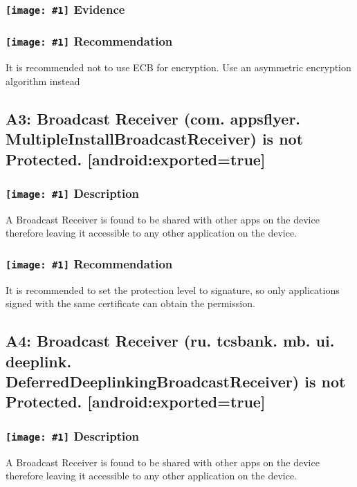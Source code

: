 \documentclass[12p]{article}
\newcommand{\icon}[1]{\texttt{[image: \#1]}}
\begin{document}
\subsubsection*{\protect\icon{/home/miki/Documents/GITHUB/AndroidPermissions/python/vulns/report_icons/basic_magnifier.png} Evidence}


\subsubsection*{\protect\icon{/home/miki/Documents/GITHUB/AndroidPermissions/python/vulns/report_icons/basic_todo.png} Recommendation}
It is recommended not to use ECB for encryption. Use an asymmetric encryption algorithm instead
\subsection{A3: Broadcast Receiver (com. appsflyer. MultipleInstallBroadcastReceiver) is not Protected. [android:exported=true]}
\subsubsection*{\protect\icon{/home/miki/Documents/GITHUB/AndroidPermissions/python/vulns/report_icons/basic_sheet.png} Description}
A Broadcast Receiver is found to be shared with other apps on the device therefore leaving it accessible to any other application on the device.
\subsubsection*{\protect\icon{/home/miki/Documents/GITHUB/AndroidPermissions/python/vulns/report_icons/basic_todo.png} Recommendation}
It is recommended to set the protection level to signature, so only applications signed with the same certificate can obtain the permission.
\subsection{A4: Broadcast Receiver (ru. tcsbank. mb. ui. deeplink. DeferredDeeplinkingBroadcastReceiver) is not Protected. [android:exported=true]}
\subsubsection*{\protect\icon{/home/miki/Documents/GITHUB/AndroidPermissions/python/vulns/report_icons/basic_sheet.png} Description}
A Broadcast Receiver is found to be shared with other apps on the device therefore leaving it accessible to any other application on the device.
\end{document}
